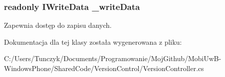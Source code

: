 \subsubsection[{\+\_\+write\+Data}]{\setlength{\rightskip}{0pt plus 5cm}readonly I\+Write\+Data \+\_\+write\+Data\hspace{0.3cm}{\ttfamily [private]}}\label{a00081_adc5e4d53bd5ac662e9a2fc345e987ea7}


Zapewnia dostęp do zapisu danych. 



Dokumentacja dla tej klasy została wygenerowana z pliku\+:\begin{DoxyCompactItemize}
\item 
C\+:/\+Users/\+Tunczyk/\+Documents/\+Programowanie/\+Moj\+Github/\+Mobi\+Uw\+B-\/\+Windows\+Phone/\+Shared\+Code/\+Version\+Control/Version\+Controller.\+cs\end{DoxyCompactItemize}

